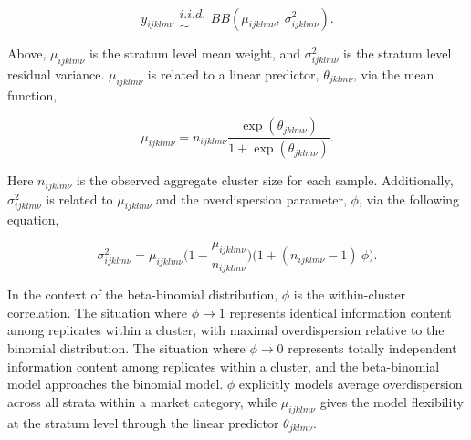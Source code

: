 \documentclass[12pt]{article}
\begin{document}
\begin{equation}
y_{ijklm\nu} \substack{i.i.d.\\\sim} BB(\mu_{ijklm\nu},~\sigma^2_{ijklm\nu}).
\end{equation}

Above, \(\mu_{ijklm\nu}\) is the stratum level mean weight, and 
\(\sigma^2_{ijklm\nu}\) is the stratum level residual variance.
\(\mu_{ijklm\nu}\) is related to a linear predictor,
\(\theta_{jklm\nu}\), via the mean function,

\begin{equation}
\mu_{ijklm\nu} = n_{ijklm\nu}\frac{\exp(\theta_{jklm\nu})}{1+\exp(\theta_{jklm\nu})}.
\end{equation}

Here \(n_{ijklm\nu}\) is the observed aggregate cluster size for each
sample. Additionally, \(\sigma^2_{ijklm\nu}\) is related to \(\mu_{ijklm\nu}\) 
and the overdispersion parameter, \(\phi\), via the following equation,

\begin{equation}
\sigma^2_{ijklm\nu} = \mu_{ijklm\nu}\Big(1-\frac{\mu_{ijklm\nu}}{n_{ijklm\nu}}\Big)\Big(1+(n_{ijklm\nu}-1)~\phi\Big).
\end{equation}

In the context of the beta-binomial distribution, \(\phi\) is the 
within-cluster correlation. The situation where \(\phi\rightarrow1\) 
represents identical information content among replicates within a cluster, 
with maximal overdispersion relative to the binomial distribution. The 
situation where \(\phi\rightarrow0\) represents totally independent information 
content among replicates within a cluster, and the beta-binomial model 
approaches the binomial model. \(\phi\) explicitly models average 
overdispersion across all strata within a market category, while 
\(\mu_{ijklm\nu}\) gives the model flexibility at the stratum level through the 
linear predictor \(\theta_{jklm\nu}\). 
\end{document}
